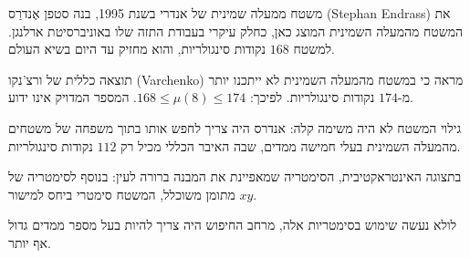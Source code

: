 \begin{surferPage}{משטח ממעלה שמינית של אנדרי}
     בשנת 1995, בנה סטפן אֶנדרַס
      \textenglish{(Stephan Endrass)}
       את המשטח מהמעלה השמינית המוצג כאן, כחלק 
    עיקרי בעבודת התזה שלו באוניברסיטת ארלנגן.
    למשטח $168$ נקודות סינגולריות, והוא מחזיק עד היום בשיא
    העולם. 
  
     תוצאה כללית של ורצ'נקו (Varchenko) מראה כי במשטח מהמעלה השמינית לא ייתכנו יותר
    מ-$174$ נקודות סינגולריות.
    לפיכך: $168 \le \mu(8) \le 174$. 
    המספר המדויק אינו ידוע.

     גילוי המשטח לא היה משימה קלה: אנדרס היה צריך לחפש אותו
    בתוך משפחה של משטחים מהמעלה השמינית בעלי חמישה ממדים, שבה האיבר הכללי
    מכיל רק $112$ נקודות סינגולריות.

    בתצוגה האינטראקטיבית, הסימטריה שמאפיינת את המבנה ברורה לעין: 
    בנוסף לסימטריה של מתומן משוכלל, המשטח סימטרי
    ביחס למישור $xy$.

    לולא נעשה שימוש בסימטריות אלה, מרחב החיפוש היה צריך להיות בעל
    מספר ממדים גדול אף יותר.
\end{surferPage}
